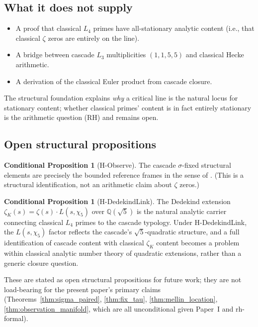 \documentclass[11pt,a4paper]{article}
\theoremstyle{definition}
\newtheorem{conditional}[theorem]{Conditional Proposition}
\theoremstyle{remark}
\begin{document}
\subsection{What it does not supply}

\begin{itemize}\itemsep0pt
  \item A proof that classical $L_4$ primes have all-stationary analytic content (i.e., that classical $\zeta$ zeros are entirely on the line).
  \item A bridge between cascade $L_3$ multiplicities $(1, 1, 5, 5)$ and classical Hecke arithmetic.
  \item A derivation of the classical Euler product from cascade closure.
\end{itemize}

The structural foundation explains \emph{why} a critical line is the
natural locus for stationary content; whether classical primes' content
is in fact entirely stationary is the arithmetic question (RH) and
remains open.

\subsection{Open structural propositions}

\begin{conditional}[H-Observe]\label{cond:observe}
The cascade $\sigma$-fixed structural elements are precisely the bounded
reference frames in the sense of \cite{SmartExistenceClosure}. (This is
a structural identification, not an arithmetic claim about $\zeta$ zeros.)
\end{conditional}

\begin{conditional}[H-DedekindLink]\label{cond:dedekind}
The Dedekind extension $\zeta_K(s) = \zeta(s) \cdot L(s, \chi_5)$ over
$\mathbb{Q}(\sqrt{5})$ is the natural analytic carrier connecting
classical $L_4$ primes to the cascade typology. Under H-DedekindLink, the
$L(s, \chi_5)$ factor reflects the cascade's $\sqrt{5}$-quadratic
structure, and a full identification of cascade content with classical
$\zeta_K$ content becomes a problem within classical analytic number
theory of quadratic extensions, rather than a generic closure question.
\end{conditional}

These are stated as open structural propositions for future work; they
are not load-bearing for the present paper's primary claims
(Theorems~\ref{thm:sigma_paired}, \ref{thm:fix_tau}, \ref{thm:mellin_location},
\ref{thm:observation_manifold}, which are all unconditional given
Paper~I and rh-formal).
\end{document}
